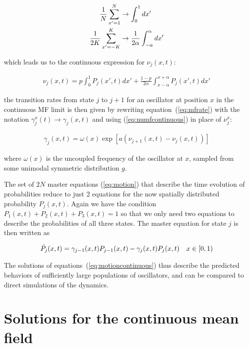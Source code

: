 \begin{align}
    \frac{1}{N}\sum_{x'=1}^N &\to \int_{0}^{1} dx' \notag\\
    \frac{1}{2K}\sum_{x'=-K}^K &\to \frac{1}{2\alpha}\int_{-\alpha}^{\alpha} dx'
\end{align}

\noindent which leads us to the continuous expression for $\nu_j(x,t)$:

\begin{align}
    \nu_j(x,t) = p \int_0^1 P_j(x',t)dx' + \frac{1-p}{2\alpha}\int_{x-\alpha}^{x+\alpha} P_j(x',t)dx'
    \label{eq:numfcontinuous}
\end{align}

\noindent the transition rates from state $j$ to $j+1$ for an oscillator at position $x$ in the continuous MF limit is then given by
rewriting equation~(\ref{eq:mfrate}) with the notation $\gamma^x_j(t) \to \gamma_j(x,t)$ and using (\ref{eq:numfcontinuous}) in place
of $\nu^x_j$:

\begin{align}
    \gamma_j(x,t) = \omega(x) \exp\left[ a\left( \nu_{j+1}(x,t) - \nu_j(x,t) \right) \right]
    \label{eq:ratecontinuous}
\end{align}

\noindent where $\omega(x)$ is the uncoupled frequency of the oscillator at $x$, sampled from some unimodal symmetric distribution $g$.

The set of $2N$ master equations (\ref{eq:motion}) that describe the time evolution of probabilities reduce to just 2 equations for the
now spatially distributed probability $P_j(x,t)$. Again we have the condition $P_1(x,t) + P_2(x,t) + P_3(x,t)=1$ so that we only need
two equations to describe the probabilities of all three states. The master equation for state $j$ is then written as

\begin{align}
    \dot{P_j}(x,t) &= \gamma_{j-1}(x,t)P_{j-1}(x,t) - \gamma_j(x,t)P_j(x,t) & x\in[0,1)
    \label{eq:motioncontinuous}
\end{align}

The solutions of equations~(\ref{eq:motioncontinuous}) thus describe the predicted behaviors of sufficiently large populations of
oscillators, and can be compared to direct simulations of the dynamics.

\section{Solutions for the continuous mean field}

